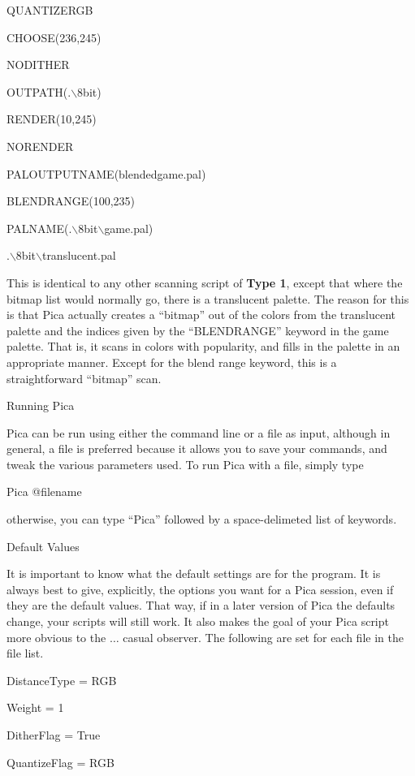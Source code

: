 QUANTIZERGB


CHOOSE(236,245)


NODITHER


OUTPATH(.$\backslash$8bit)


RENDER(10,245)


NORENDER


PALOUTPUTNAME(blendedgame.pal)


BLENDRANGE(100,235)


PALNAME(.$\backslash$8bit$\backslash$game.pal)


.$\backslash$8bit$\backslash$translucent.pal


\newpar This is identical to any other scanning script of {\bf Type 1}, except that where the
bitmap list would normally go, there is a translucent palette. The reason for this is that
Pica actually creates a ``bitmap'' out of the colors from the translucent palette and the
indices given by the ``BLENDRANGE'' keyword in the game palette. That is, it scans in colors
with popularity, and fills in the palette in an appropriate manner. Except for the blend
range keyword, this is a straightforward ``bitmap'' scan.

\newpar
{\SectionFont Running Pica}

\newpar Pica can be run using either the command line or a file as input, although in 
general, a file is preferred because it allows you to save your commands, and tweak the
various parameters used. To run Pica with a file, simply type


Pica @filename


\newpar otherwise, you can type ``Pica'' followed by a space-delimeted list of keywords. 


\newpar
{\SectionFont Default Values}

\newpar
It is important to know what the default settings are for the program. It is always best to 
give, explicitly, the options you want for a Pica session, even if they are the default values.
That way, if in a later version of Pica the defaults change, your scripts will still work. It also
makes the goal of your Pica script more obvious to the $\ldots$ casual observer. The following
are set for each file in the file list.



DistanceType      	= RGB


Weight            	= 1


DitherFlag        	= True


QuantizeFlag      	= RGB


